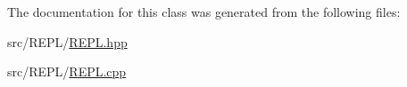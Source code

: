 The documentation for this class was generated from the following files\+:\begin{DoxyCompactItemize}
\item 
src/\+R\+E\+P\+L/\mbox{\hyperlink{_r_e_p_l_8hpp}{R\+E\+P\+L.\+hpp}}\item 
src/\+R\+E\+P\+L/\mbox{\hyperlink{_r_e_p_l_8cpp}{R\+E\+P\+L.\+cpp}}\end{DoxyCompactItemize}
